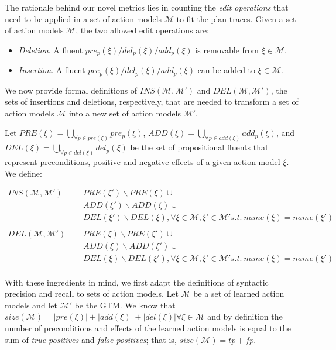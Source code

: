 The rationale behind our novel metrics lies in counting the \emph{edit operations} that need to be applied in a set of action models $\mathcal{M}$ to fit the plan traces. Given a set of action models $\mathcal{M}$, the two allowed edit operations are:

\begin{itemize}
\item {\em Deletion}. A fluent $pre_p(\xi)/del_p(\xi)/add_p(\xi)$ is removable from $\xi\in\mathcal{M}$.
\item {\em Insertion}. A fluent $pre_p(\xi)/del_p(\xi)/add_p(\xi)$ can be added to $\xi\in\mathcal{M}$.
\end{itemize}

We now provide formal definitions of $INS(\mathcal{M},\mathcal{M'})$ and $DEL(\mathcal{M},\mathcal{M'})$, the sets of insertions and deletions, respectively, that are needed to transform a set of action models $\mathcal{M}$ into a new set of action models $\mathcal{M'}$.

\begin{mydefinition}
	Let $PRE(\xi) = \underset{\forall p \in pre(\xi)}{\bigcup} pre_p(\xi)$, $ADD(\xi) = \underset{\forall p \in add(\xi)}{\bigcup} add_p(\xi)$, and $DEL(\xi) = \underset{\forall p \in del(\xi)}{\bigcup} del_p(\xi)$ be the set of propositional fluents that represent preconditions, positive and negative effects of a given action model $\xi$. We define:
	\begin{small}
		\begin{align*}
		INS(\mathcal{M}, \mathcal{M'})=&PRE(\xi') \backslash PRE(\xi) \cup\\
		&ADD(\xi') \backslash ADD(\xi) \cup \\
		&DEL(\xi') \backslash DEL(\xi),\forall \xi\in\mathcal{M}, \xi'\in\mathcal{M'} s.t.\ name(\xi) = name(\xi')\\
		\\
		DEL(\mathcal{M}, \mathcal{M'})=&PRE(\xi) \backslash PRE(\xi') \cup\\
		&ADD(\xi) \backslash ADD(\xi') \cup \\
		&DEL(\xi) \backslash DEL(\xi'),\forall \xi\in\mathcal{M}, \xi'\in\mathcal{M'} s.t.\ name(\xi) = name(\xi')\\
		\end{align*}
	\end{small}
\end{mydefinition}


With these ingredients in mind, we first adapt the definitions of syntactic precision and recall to sets of action models. Let $\mathcal{M}$ be a set of learned action models and let $\mathcal{M'}$ be the GTM. We know that $size(\mathcal{M}) = \left|pre(\xi)\right| + \left|add(\xi)\right| + \left|del(\xi)\right| \forall \xi \in \mathcal{M}$ and by definition the number of preconditions and effects of the learned action models is equal to the sum of {\em true positives} and {\em false positives}; that is, $size(\mathcal{M}) = tp + fp$.

